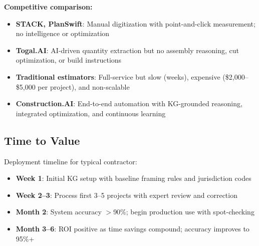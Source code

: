 \textbf{Competitive comparison:}
\begin{itemize}
  \item \textbf{STACK, PlanSwift}: Manual digitization with point-and-click measurement; no intelligence or optimization
  \item \textbf{Togal.AI}: AI-driven quantity extraction but no assembly reasoning, cut optimization, or build instructions
  \item \textbf{Traditional estimators}: Full-service but slow (weeks), expensive (\$2,000--\$5,000 per project), and non-scalable
  \item \textbf{Construction.AI}: End-to-end automation with KG-grounded reasoning, integrated optimization, and continuous learning
\end{itemize}

\subsection{Time to Value}

Deployment timeline for typical contractor:
\begin{itemize}
  \item \textbf{Week 1}: Initial KG setup with baseline framing rules and jurisdiction codes
  \item \textbf{Week 2--3}: Process first 3--5 projects with expert review and correction
  \item \textbf{Month 2}: System accuracy $>$90\%; begin production use with spot-checking
  \item \textbf{Month 3--6}: ROI positive as time savings compound; accuracy improves to 95\%+
\end{itemize}

